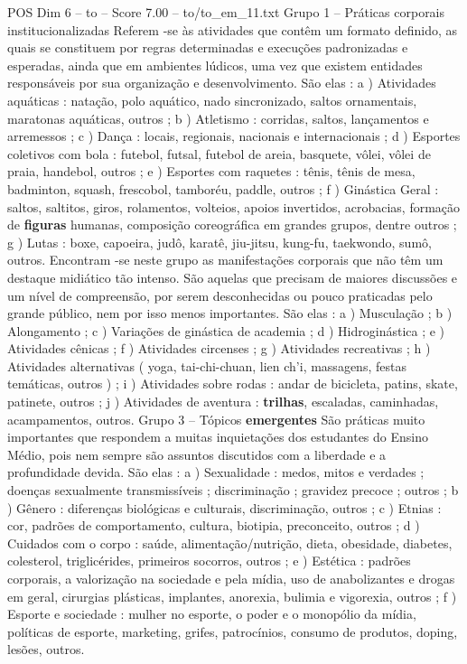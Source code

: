 \begin{textsample}{POS Dim 6 – to – Score 7.00 – to/to\_em\_11.txt}
Grupo 1 – Práticas corporais institucionalizadas Referem -se às atividades que contêm um formato definido, as quais se constituem por regras determinadas e execuções padronizadas e esperadas, ainda que em ambientes lúdicos, uma vez que existem entidades responsáveis por sua organização e desenvolvimento.
São elas : a ) Atividades aquáticas : natação, polo aquático, nado sincronizado, saltos ornamentais, maratonas aquáticas, outros ; b ) Atletismo : corridas, saltos, lançamentos e arremessos ; c ) Dança : locais, regionais, nacionais e internacionais ; d ) Esportes coletivos com bola : futebol, futsal, futebol de areia, basquete, vôlei, vôlei de praia, handebol, outros ; e ) Esportes com raquetes : tênis, tênis de mesa, badminton, squash, frescobol, tamboréu, paddle, outros ; f ) Ginástica Geral : saltos, saltitos, giros, rolamentos, volteios, apoios invertidos, acrobacias, formação de \textbf{figuras} humanas, composição coreográfica em grandes grupos, dentre outros ; g ) Lutas : boxe, capoeira, judô, karatê, jiu-jitsu, kung-fu, taekwondo, sumô, outros.
Encontram -se neste grupo as manifestações corporais que não têm um destaque midiático tão intenso.
São aquelas que precisam de maiores discussões e um nível de compreensão, por serem desconhecidas ou pouco praticadas pelo grande público, nem por isso menos importantes.
São elas : a ) Musculação ; b ) Alongamento ; c ) Variações de ginástica de academia ; d ) Hidroginástica ; e ) Atividades cênicas ; f ) Atividades circenses ; g ) Atividades recreativas ; h ) Atividades alternativas ( yoga, tai-chi-chuan, lien ch’i, massagens, festas temáticas, outros ) ; i ) Atividades sobre rodas : andar de bicicleta, patins, skate, patinete, outros ; j ) Atividades de aventura : \textbf{trilhas}, escaladas, caminhadas, acampamentos, outros.
Grupo 3 – Tópicos \textbf{emergentes} São práticas muito importantes que respondem a muitas inquietações dos estudantes do Ensino Médio, pois nem sempre são assuntos discutidos com a liberdade e a profundidade devida.
São elas : a ) Sexualidade : medos, mitos e verdades ; doenças sexualmente transmissíveis ; discriminação ; gravidez precoce ; outros ; b ) Gênero : diferenças biológicas e culturais, discriminação, outros ; c ) Etnias : cor, padrões de comportamento, cultura, biotipia, preconceito, outros ; d ) Cuidados com o corpo : saúde, alimentação/nutrição, dieta, obesidade, diabetes, colesterol, triglicérides, primeiros socorros, outros ; e ) Estética : padrões corporais, a valorização na sociedade e pela mídia, uso de anabolizantes e drogas em geral, cirurgias plásticas, implantes, anorexia, bulimia e vigorexia, outros ; f ) Esporte e sociedade : mulher no esporte, o poder e o monopólio da mídia, políticas de esporte, marketing, grifes, patrocínios, consumo de produtos, doping, lesões, outros.

\end{textsample}
